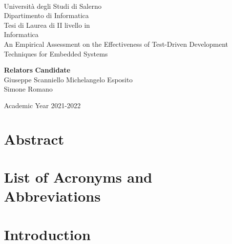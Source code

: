 \documentclass[11pt,oneside]{book}
\theoremstyle{definition}
\begin{document}
    \begin{titlepage}
        \begin{center}
            \\[0.2truecm]
            {\Large Universit\`a degli Studi di Salerno}\\[0.2truecm]
            {\large Dipartimento di Informatica}\\
            \hrulefill
            \vfill
            {\large Tesi di Laurea di II livello in }\\[0.2truecm]
            {\Large Informatica}\\
            \vfill\vfill
            {\Huge An Empirical Assessment on the Effectiveness of Test-Driven Development Techniques for Embedded Systems}
            \vfill\vfill
            
            
            {\bf Relators} \hfill {\bf Candidate}\ \ \\
            Giuseppe Scanniello \hfill Michelangelo Esposito\\
            Simone Romano \hfill \ \ \\
            
            \vfill
            \hrulefill 
            
            Academic Year 2021-2022
        
        \end{center}
    \end{titlepage}


    \chapter*{Abstract}
    
    
    \tableofcontents
    \pagestyle{plain}

    

    \chapter*{List of Acronyms and Abbreviations}
    

    \chapter{Introduction}
    \setcounter{page}{1} 	%
    
\end{document}
